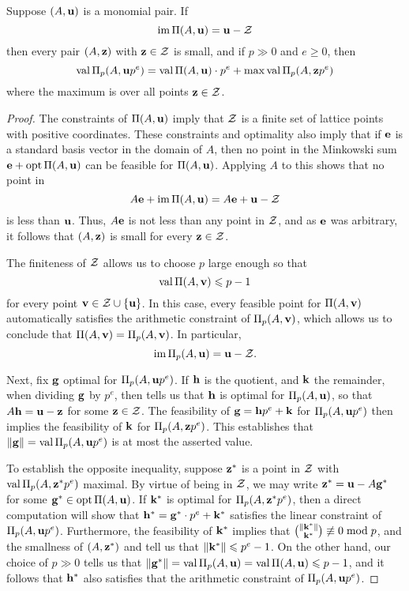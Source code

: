 \documentclass[11pt]{amsart}
\renewcommand{\!}[1]{{\color{red}\text{$\star$\,}#1\,$\star$}}
\begin{document}
\begin{proposition}
Suppose $(A, \mathbf{u})$ is a monomial pair.  If \[ \operatorname{im} \Pi(A, \mathbf{u}) = \mathbf{u} - \mathcal{Z}\] then every pair $(A, \mathbf{z})$ with $\mathbf{z} \in \mathcal{Z}$ is small, and if $p \gg 0$ and $e \geq 0$, then 
\[ \operatorname{val} \Pi_p(A, \mathbf{u} p^e) = \operatorname{val} \Pi(A, \mathbf{u}) \cdot p^e + \max \operatorname{val} \Pi_p(A, \mathbf{z}p^e) \]
where the maximum is over all points $\mathbf{z} \in \mathcal{Z}$.
\end{proposition}

\begin{proof}  The constraints of $\Pi(A, \mathbf{u})$ imply that $\mathcal{Z}$ is a finite set of lattice points with positive coordinates.   These constraints and optimality also imply that if $\mathbf{e}$ is a standard basis vector in the domain of $A$, then no point in the Minkowski sum $\mathbf{e} + \operatorname{opt} \Pi(A, \mathbf{u})$ can be feasible for $\Pi(A, \mathbf{u})$.  Applying $A$ to this shows that no point in 
\[ A \mathbf{e} + \operatorname{im} \Pi(A, \mathbf{u}) = A \mathbf{e} + \mathbf{u} - \mathcal{Z} \] 
is less than $\mathbf{u}$.  Thus, $A \mathbf{e}$ is not less than any point in $\mathcal{Z}$, and as $\mathbf{e}$ was arbitrary, it follows that $(A, \mathbf{z})$ is small for every $\mathbf{z} \in \mathcal{Z}$.

The finiteness of $\mathcal{Z}$ allows us to choose $p$ large enough so that \[ \operatorname{val} \Pi(A, \mathbf{v}) \leqslant p -1 \] for every point $\mathbf{v} \in \mathcal{Z} \cup \{ \mathbf{u} \}$.  In this case, every feasible point for $\Pi(A, \mathbf{v})$  automatically satisfies the arithmetic constraint of $\Pi_p(A, \mathbf{v})$, which allows us to conclude that $\Pi(A, \mathbf{v}) = \Pi_p(A, \mathbf{v})$.  In particular, \[ \operatorname{im} \Pi_p(A, \mathbf{u}) =\mathbf{u} - \mathcal{Z}. \] 

Next, fix $\mathbf{g}$ optimal for $\Pi_p(A, \mathbf{u}p^e)$.  If $\mathbf{h}$ is the quotient, and $\mathbf{k}$ the remainder, when dividing $\mathbf{g}$ by $p^e$, then  tells us that $\mathbf{h}$ is optimal for $\Pi_p(A, \mathbf{u})$, so that $A \mathbf{h} = \mathbf{u}-\mathbf{z}$ for some $\mathbf{z} \in \mathcal{Z}$.  The feasibility of $\mathbf{g}=\mathbf{h}p^e + \mathbf{k}$ for $\Pi_p(A, \mathbf{u}p^e)$ then implies the feasibility of $\mathbf{k}$ for $\Pi_p(A, \mathbf{z}p^e)$.  This establishes that $\| \mathbf{g} \| = \operatorname{val} \Pi_p(A, \mathbf{u}p^e)$ is at most the asserted value.

To establish the opposite inequality, suppose $\mathbf{z}^{\ast}$ is a point in $\mathcal{Z}$ with $\operatorname{val} \Pi_p(A, \mathbf{z}^{\ast} p^e)$ maximal.  By virtue of being in $\mathcal{Z}$, we may write $\mathbf{z}^{\ast} = \mathbf{u} - A \mathbf{g}^{\ast}$ for some $\mathbf{g}^{\ast} \in \operatorname{opt} \Pi(A, \mathbf{u})$.  If $\mathbf{k}^{\ast}$ is optimal for $\Pi_p(A, \mathbf{z}^{\ast} p^e)$, then a direct computation will show that 
$\mathbf{h}^{\ast} = \mathbf{g}^{\ast} \cdot p^e + \mathbf{k}^{\ast}$ satisfies the linear constraint of  $\Pi_p(A, \mathbf{u}p^e)$.  Furthermore, the feasibility of $\mathbf{k}^{\ast}$ implies that $\binom{\| \mathbf{k}^{\ast} \|}{\mathbf{k}^{\ast}} \not \equiv 0 \bmod p$, and the smallness of $(A, \mathbf{z}^{\ast})$ and  tell us that $\| \mathbf{k}^{\ast} \| \leqslant p^e-1$.  On the other hand, our choice of $p \gg 0$ tells us that $\| \mathbf{g}^{\ast} \| = \operatorname{val} \Pi_p(A, \mathbf{u}) = \operatorname{val} \Pi(A, \mathbf{u}) \leqslant p-1$, and it follows that $\mathbf{h}^{\ast}$ also satisfies that the arithmetic constraint of $\Pi_p(A, \mathbf{u}p^e)$.
\end{proof}
\end{document}
